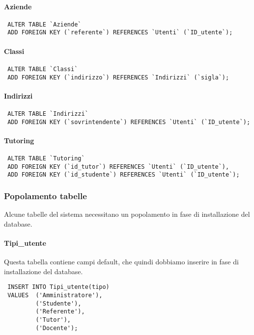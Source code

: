 \documentclass[12pt]{article}
\begin{document}
\paragraph{Aziende}
\begin{verbatim}
 ALTER TABLE `Aziende`
 ADD FOREIGN KEY (`referente`) REFERENCES `Utenti` (`ID_utente`);
\end{verbatim}

\paragraph{Classi}
\begin{verbatim}
 ALTER TABLE `Classi`
 ADD FOREIGN KEY (`indirizzo`) REFERENCES `Indirizzi` (`sigla`);
\end{verbatim}

\paragraph{Indirizzi}
\begin{verbatim}
 ALTER TABLE `Indirizzi`
 ADD FOREIGN KEY (`sovrintendente`) REFERENCES `Utenti` (`ID_utente`);
\end{verbatim}

\paragraph{Tutoring}
\begin{verbatim}
 ALTER TABLE `Tutoring`
 ADD FOREIGN KEY (`id_tutor`) REFERENCES `Utenti` (`ID_utente`),
 ADD FOREIGN KEY (`id_studente`) REFERENCES `Utenti` (`ID_utente`);
\end{verbatim}

\newpage
\subsubsection{Popolamento tabelle}
Alcune tabelle del sistema necessitano un popolamento in fase di installazione del database.
\paragraph{Tipi\_utente} Questa tabella contiene campi default, che quindi dobbiamo inserire in fase di installazione del database.
\begin{verbatim}
 INSERT INTO Tipi_utente(tipo)
 VALUES  ('Amministratore'),
         ('Studente'),
         ('Referente'),
         ('Tutor'),
         ('Docente');
\end{verbatim}
\end{document}
